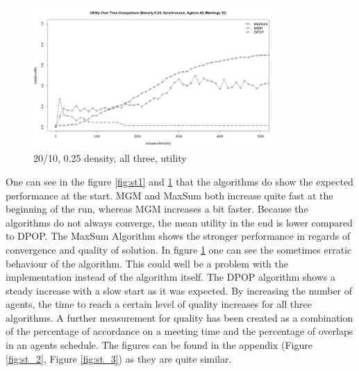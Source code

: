 \begin{figure}[H]
\centering
\includegraphics[width=350px]{graphics/experiments/static/st_3}
\caption{20/10, 0.25 density, all three, utility}
\label{fig:st2}

\end{figure}

One can see in the figure \ref{fig:st1} and \ref{fig:st2} that the algorithms do show the expected performance at the start. MGM and MaxSum both increase quite fast at the beginning of the run, whereas MGM increases a bit faster. Because the algorithms do not always converge, the mean utility in the end is lower compared to DPOP. The MaxSum Algorithm shows the stronger performance in regards of convergence and quality of solution. In figure \ref{fig:st2} one can see the sometimes erratic behaviour of the algorithm. This could well be a problem with the implementation instead of the algorithm itself. The DPOP algorithm shows a steady increase with a slow start as it was expected. By increasing the number of agents, the time to reach a certain level of quality increases for all three algorithms. A further measurement for quality has been created as a combination of the percentage of accordance on a meeting time and the percentage of overlaps in an agents schedule. The figures can be found in the appendix (Figure \ref{fig:st_2}, Figure \ref{fig:st_3}) as they are quite similar.

